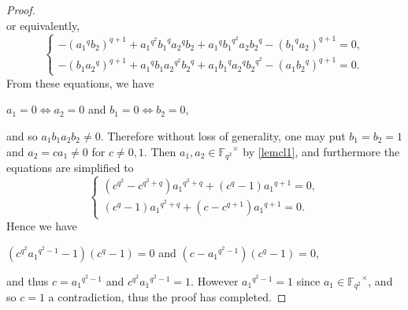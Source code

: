 \documentclass[10pt,a4paper]{amsart}
\newcommand{\pmat}[1]{\begin{pmatrix} #1 \end{pmatrix}}
\begin{document}
\begin{proof}
$$$$
or equivalently,
$$
\begin{cases}
-({a_1}^qb_2)^{q+1}+{a_1}^{q^2}{b_1}^q{a_2}^qb_2+{a_1}^q{b_1}^{q^2}a_2{b_2}^q-({b_1}^qa_2)^{q+1}=0,\\
-(b_1{a_2}^q)^{q+1}+{a_1}^{q}{b_1}{a_2}^{q^2}{b_2}^q+{a_1}{b_1}^{q}{a_2}^q{b_2}^{q^2}-(a_1{b_2}^q)^{q+1}=0.
\end{cases}
$$
From these equations, we have 
\begin{center}
$a_1=0\iff a_2=0$ and $b_1=0\iff b_2=0$, 
\end{center}
and so $a_1b_1a_2b_2\neq0$. Therefore without loss of generality, one may put $b_1=b_2=1$ and $a_2=ca_1\neq0$ for $c\neq0,1$. Then $a_1,a_2\in{\mathbb{F}_{q^2}}^\times$ by \eqref{lemcl1}, and furthermore the equations are simplified to
\begin{equation*}%
\begin{cases}
(c^{q^2}-c^{q^2+q}){a_1}^{q^2+q}+(c^q-1){a_1}^{q+1}=0,\\
(c^q-1){a_1}^{q^2+q}+(c-c^{q+1}){a_1}^{q+1}=0.
\end{cases}
\end{equation*}
Hence
we have
\begin{center}
$(c^{q^2}{a_1}^{q^2-1}-1)(c^q-1)=0$ and $(c-{a_1}^{q^2-1})(c^{q}-1)=0$,
\end{center}
and thus $c={a_1}^{q^2-1}$ and $c^{q^2}{a_1}^{q^2-1}=1$. However ${a_1}^{q^2-1}=1$ since $a_1\in{\mathbb{F}_{q^2}}^\times$, and so $c=1$
a contradiction, thus the proof has completed.
\end{proof}
\end{document}
